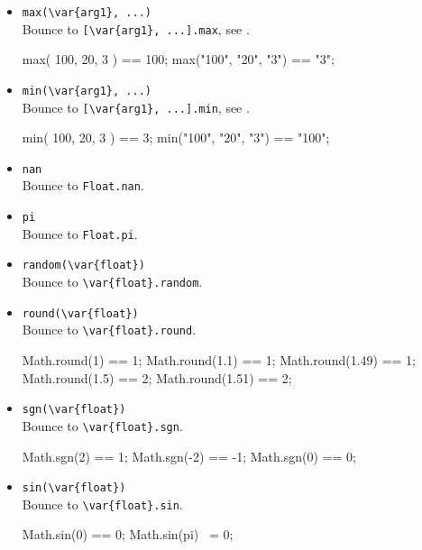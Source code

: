 \begin{itemize}
\item \lstinline|max(\var{arg1}, ...)|\\
  Bounce to \lstinline|[\var{arg1}, ...].max|, see .
\begin{urbiassert}[firstnumber=last]
max( 100,   20,   3 ) == 100;
max("100", "20", "3") == "3";
\end{urbiassert}

\item \lstinline|min(\var{arg1}, ...)|\\
  Bounce to \lstinline|[\var{arg1}, ...].min|, see .
\begin{urbiassert}[firstnumber=last]
min( 100,   20,   3 ) ==     3;
min("100", "20", "3") == "100";
\end{urbiassert}

\item \lstinline|nan|\\
  Bounce to \lstinline|Float.nan|.

\item \lstinline|pi|\\
  Bounce to \lstinline|Float.pi|.

\item \lstinline|random(\var{float})|\\
  Bounce to \lstinline|\var{float}.random|.

\item \lstinline|round(\var{float})|\\
  Bounce to \lstinline|\var{float}.round|.
\begin{urbiassert}[firstnumber=last]
Math.round(1) == 1;
Math.round(1.1) == 1;
Math.round(1.49) == 1;
Math.round(1.5) == 2;
Math.round(1.51) == 2;
\end{urbiassert}

\item \lstinline|sgn(\var{float})|\\
  Bounce to \lstinline|\var{float}.sgn|.
\begin{urbiassert}[firstnumber=last]
Math.sgn(2) == 1;
Math.sgn(-2) == -1;
Math.sgn(0) == 0;
\end{urbiassert}

\item \lstinline|sin(\var{float})|\\
  Bounce to \lstinline|\var{float}.sin|.
\begin{urbiassert}[firstnumber=last]
Math.sin(0) == 0;
Math.sin(pi) ~= 0;
\end{urbiassert}


\end{itemize}
